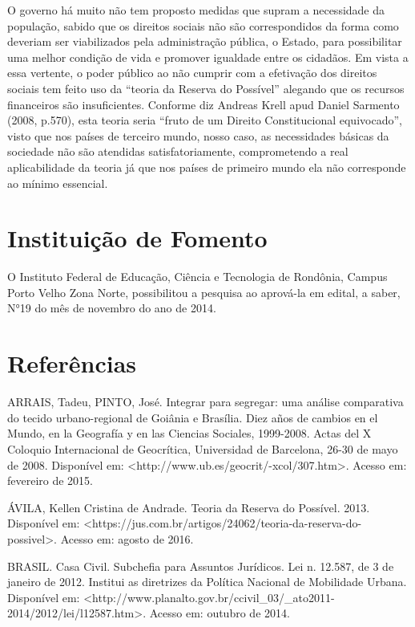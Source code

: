 \documentclass[article,12pt,onesidea,4paper,english,brazil]{abntex2}
\begin{document}
	O governo há muito não tem proposto medidas que supram a necessidade da população, sabido que os direitos sociais não são correspondidos da forma como deveriam ser viabilizados pela administração pública, o Estado, para possibilitar uma melhor condição de vida e promover igualdade entre os cidadãos. Em vista a essa vertente, o poder público ao não cumprir com a efetivação dos direitos sociais tem feito uso da “teoria da Reserva do Possível” alegando que os recursos financeiros são insuficientes. Conforme diz Andreas Krell apud Daniel Sarmento (2008, p.570), esta teoria seria “fruto de um Direito Constitucional equivocado”, visto que nos países de terceiro mundo, nosso caso, as necessidades básicas da sociedade não são atendidas satisfatoriamente, comprometendo a real aplicabilidade da teoria já que nos países de primeiro mundo ela não corresponde ao mínimo essencial.
	
	\section*{Instituição de Fomento}
	
	O Instituto Federal de Educação, Ciência e Tecnologia de Rondônia, Campus Porto Velho Zona Norte, possibilitou a pesquisa ao aprová-la em edital, a saber, N°19 do mês de novembro do ano de 2014.
	
	\section*{Referências}
	
	\sloppy
	
	\noindent ARRAIS, Tadeu, PINTO, José. Integrar para segregar: uma análise comparativa do tecido urbano-regional de Goiânia e Brasília. Diez años de cambios en el Mundo, en la Geografía y en las Ciencias Sociales, 1999-2008. Actas del X Coloquio Internacional de Geocrítica, Universidad de Barcelona, 26-30 de mayo de 2008. Disponível em: <http://www.ub.es/geocrit/-xcol/307.htm>. Acesso em: fevereiro de 2015.
	
	\noindent ÁVILA, Kellen Cristina de Andrade. Teoria da Reserva do Possível. 2013. Disponível em: <https://jus.com.br/artigos/24062/teoria-da-reserva-do-possivel>. Acesso em: agosto de 2016.
	
	\noindent BRASIL. Casa Civil. Subchefia para Assuntos Jurídicos. Lei n. 12.587, de 3 de janeiro de 2012. Institui as diretrizes da Política Nacional de Mobilidade Urbana.
	Disponível em: <http://www.planalto.gov.br/ccivil\_03/\_ato2011- 2014/2012/lei/l12587.htm>. Acesso em: outubro de 2014.
	
\end{document}
